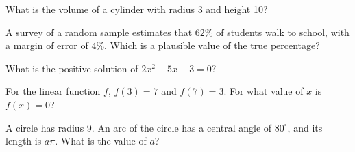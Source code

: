 \begin{exo}{}
What is the volume of a cylinder with radius 3 and height 10?
\choices{$90\pi$}{$30\pi$}{$60\pi$}{$300\pi$}
\end{exo}
\begin{exo}{}
A survey of a random sample estimates that $62\%$ of students walk to school, with a margin of error of $4\%$. Which is a plausible value of the true percentage?
\end{exo}
\begin{exo}{\sprtag}
What is the positive solution of $2x^2-5x-3=0$?
\end{exo}
\begin{exo}[Algebra]{}
For the linear function $f$, $f(3)=7$ and $f(7)=3$. For what value of $x$ is $f(x)=0$?
\end{exo}
\begin{exo}{\sprtag}
A circle has radius 9. An arc of the circle has a central angle of $80^\circ$, and its length is $a\pi$. What is the value of $a$?
\end{exo}

